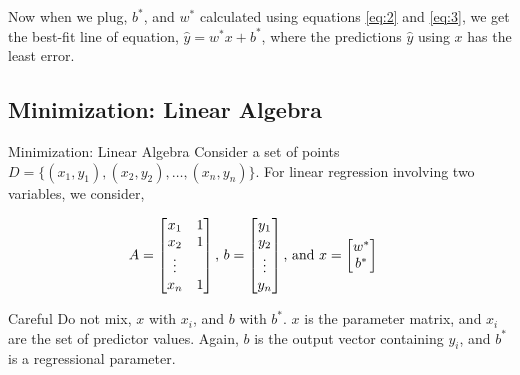 \documentclass[pdf]{beamer}
\begin{document}
    \begin{frame}
        Now when we plug, \(b^*\), and \(w^*\) calculated using equations \eqref{eq:2} and \eqref{eq:3}, we get the best-fit line of equation, \(\hat y=w^*x+b^*\), where the predictions \(\hat y\) using \(x\) has the least error.
    \end{frame}

    \subsection{Minimization: Linear Algebra}
    \begin{frame}{Minimization: Linear Algebra}
        Consider a set of points \(D=\{(x_1,y_1),(x_2,y_2),\ldots,(x_n,y_n)\}\). For linear regression involving two variables, we consider,

        \begin{align*}
            A&=\begin{bmatrix}
            x_1&1\\
            x_2&1\\
            \vdots\\
            x_n&1
        \end{bmatrix}\textnormal{, }
        b=\begin{bmatrix}
            y_1\\
            y_2\\
            \vdots\\
            y_n
        \end{bmatrix}\textnormal{, and }
        x=\begin{bmatrix}
            w^*\\
            b^*
        \end{bmatrix}
        \end{align*}

        \begin{alertblock}{Careful}
            Do not mix, \(x\) with \(x_i\), and \(b\) with \(b^*\). \(x\) is the parameter matrix, and \(x_i\) are the set of predictor values. Again, \(b\) is the output vector containing \(y_i\), and \(b^*\) is a regressional parameter. 
        \end{alertblock}
    \end{frame}
\end{document}
